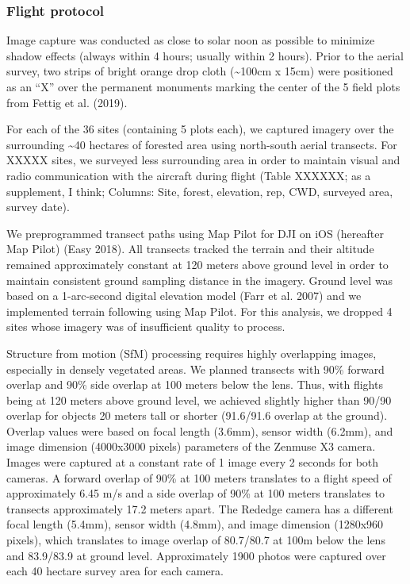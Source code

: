 \documentclass[]{article}
\begin{document}
\subsubsection{Flight protocol}\label{flight-protocol}

Image capture was conducted as close to solar noon as possible to
minimize shadow effects (always within 4 hours; usually within 2 hours).
Prior to the aerial survey, two strips of bright orange drop cloth
(\textasciitilde{}100cm x 15cm) were positioned as an ``X'' over the
permanent monuments marking the center of the 5 field plots from Fettig
et al. (2019).

For each of the 36 sites (containing 5 plots each), we captured imagery
over the surrounding \textasciitilde{}40 hectares of forested area using
north-south aerial transects. For XXXXX sites, we surveyed less
surrounding area in order to maintain visual and radio communication
with the aircraft during flight (Table XXXXXX; as a supplement, I think;
Columns: Site, forest, elevation, rep, CWD, surveyed area, survey date).

We preprogrammed transect paths using Map Pilot for DJI on iOS
(hereafter Map Pilot) (Easy 2018). All transects tracked the terrain and
their altitude remained approximately constant at 120 meters above
ground level in order to maintain consistent ground sampling distance in
the imagery. Ground level was based on a 1-arc-second digital elevation
model (Farr et al. 2007) and we implemented terrain following using Map
Pilot. For this analysis, we dropped 4 sites whose imagery was of
insufficient quality to process.

Structure from motion (SfM) processing requires highly overlapping
images, especially in densely vegetated areas. We planned transects with
90\% forward overlap and 90\% side overlap at 100 meters below the lens.
Thus, with flights being at 120 meters above ground level, we achieved
slightly higher than 90/90 overlap for objects 20 meters tall or shorter
(91.6/91.6 overlap at the ground). Overlap values were based on focal
length (3.6mm), sensor width (6.2mm), and image dimension (4000x3000
pixels) parameters of the Zenmuse X3 camera. Images were captured at a
constant rate of 1 image every 2 seconds for both cameras. A forward
overlap of 90\% at 100 meters translates to a flight speed of
approximately 6.45 m/s and a side overlap of 90\% at 100 meters
translates to transects approximately 17.2 meters apart. The Rededge
camera has a different focal length (5.4mm), sensor width (4.8mm), and
image dimension (1280x960 pixels), which translates to image overlap of
80.7/80.7 at 100m below the lens and 83.9/83.9 at ground level.
Approximately 1900 photos were captured over each 40 hectare survey area
for each camera.
\end{document}
